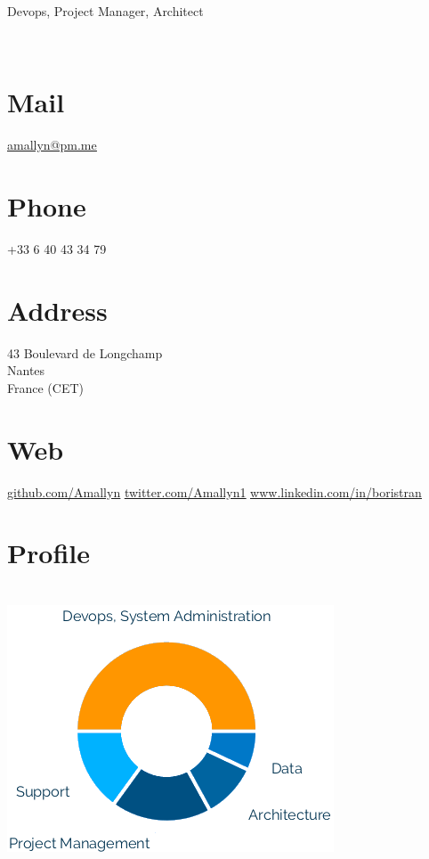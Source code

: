 \documentclass[]{cv-class}
\begin{document}
\vspace{0.2cm}
      {Devops, Project Manager, Architect}

\vspace{1.15cm}

\begin{aside}
  \vspace{0.4cm}
    ~		
  \vspace{0.65cm}
  \section{Mail}
    \underline{\href{mailto:amallyn@pm.me}{amallyn@pm.me}}
    ~
  \section{Phone}
    +33 6 40 43 34 79
    ~
  \section{Address}
    43 Boulevard de Longchamp\\
    Nantes\\
    France (CET)
    ~
  \section{Web}
	\vspace{0.10cm}
    \underline{\href{https://github.com/Amallyn}{github.com/Amallyn}}
	\vspace{0.10cm}
    \underline{\href{https://twitter.com/Amallyn1}{twitter.com/Amallyn1}}
	\vspace{0.10cm}
    \underline{\href{https://www.linkedin.com/in/boristran}{www.linkedin.com/in/boristran}}
    ~
  \section{Profile}
    \\
    \includegraphics[scale=0.8]{img/skills.png}
    ~

\end{aside}
\end{document}
